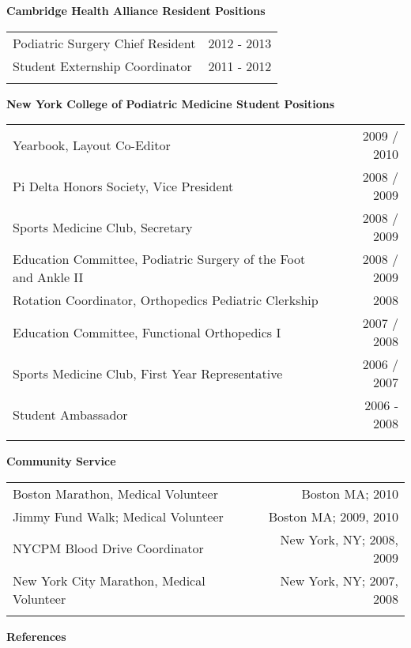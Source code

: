 \documentclass[letterpaper,10pt]{article}
\newcommand{\len}{7in}
\newcommand{\resheading}[1]{{\large \colorbox{mygrey}{
    \begin{minipage}{6.9in}{\textbf{#1}}
    \end{minipage}}}}
\begin{document}
\resheading{Cambridge Health Alliance Resident Positions}
\begin{tabular*}{\len}{@{\extracolsep{\fill}}lr}
    \\
    Podiatric Surgery Chief Resident & 2012 - 2013 \\
    Student Externship Coordinator & 2011 - 2012 \\
    \\
\end{tabular*}
\resheading{New York College of Podiatric Medicine Student Positions}
\begin{tabular*}{\len}{@{\extracolsep{\fill}}lr}
    \\
    Yearbook, Layout Co-Editor & 2009 / 2010 \\
    Pi Delta Honors Society, Vice President & 2008 / 2009 \\
    Sports Medicine Club, Secretary & 2008 / 2009 \\
    Education Committee, Podiatric Surgery of the Foot and Ankle II & 2008 / 2009 \\
    Rotation Coordinator, Orthopedics Pediatric Clerkship & 2008 \\
    Education Committee, Functional Orthopedics I & 2007 / 2008 \\
    Sports Medicine Club, First Year Representative & 2006 / 2007 \\
    Student Ambassador & 2006 - 2008 \\
    \\
\end{tabular*}
\newpage
\resheading{Community Service}
\begin{tabular*}{\len}{@{\extracolsep{\fill}}lr}
    \\
    Boston Marathon, Medical Volunteer & Boston MA; 2010 \\
    Jimmy Fund Walk; Medical Volunteer & Boston MA; 2009, 2010 \\
    NYCPM Blood Drive Coordinator & New York, NY; 2008, 2009 \\
    New York City Marathon, Medical Volunteer & New York, NY; 2007, 2008 \\
    \\
\end{tabular*}
\resheading{References}
\end{document}
